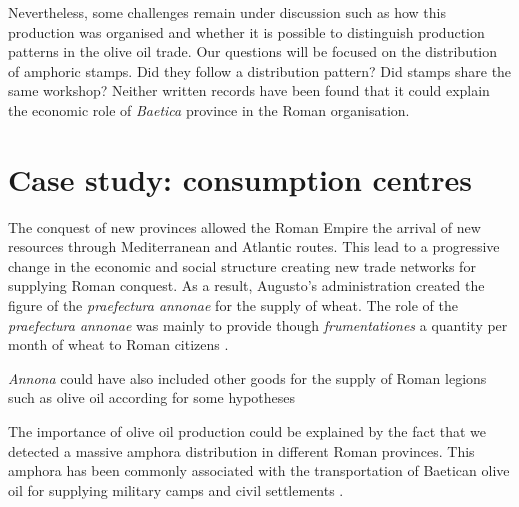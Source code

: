 \documentclass[review]{elsarticle}
\begin{document}
Nevertheless, some challenges remain under discussion such as how this production was organised and whether it is possible to distinguish production patterns in the olive oil trade. Our questions will be focused on the distribution of amphoric stamps. Did they follow a distribution pattern? Did stamps share the same workshop? Neither written records have been found that it could explain the economic role of \textit{Baetica} province in the Roman organisation.  



\section{Case study: consumption centres}

The conquest of new provinces allowed the Roman Empire the arrival of new resources through Mediterranean and Atlantic routes. This lead to a progressive change in the economic and social structure creating new trade networks for supplying Roman conquest. As a result, Augusto's administration created the figure of the \textit{praefectura annonae} for the supply of wheat. The role of the \textit{praefectura annonae} was mainly to provide though \textit{frumentationes} a quantity per month of wheat to Roman citizens \citep{remesal_annona_1986,remesal_concierto}. 

\textit{Annona} could have also included other goods for the supply of Roman legions such as olive oil according for some hypotheses \citep{remesal_annona_1986,remesal_annona_1990}

The importance of olive oil production could be explained by the fact that we detected a massive amphora distribution in different Roman provinces. This amphora has been commonly associated with the  transportation of Baetican olive oil for supplying military camps and civil settlements \citep{berni_millet_epigrafianforica_2008}. 
\end{document}
